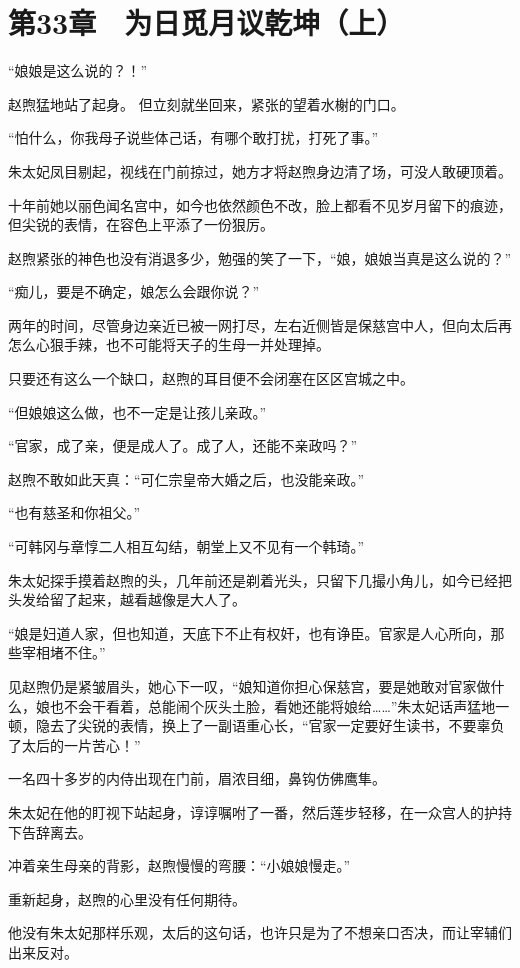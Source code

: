 \section{第33章　为日觅月议乾坤（上）}

“娘娘是这么说的？！”

赵煦猛地站了起身。 但立刻就坐回来，紧张的望着水榭的门口。

“怕什么，你我母子说些体己话，有哪个敢打扰，打死了事。”

朱太妃凤目剔起，视线在门前掠过，她方才将赵煦身边清了场，可没人敢硬顶着。

十年前她以丽色闻名宫中，如今也依然颜色不改，脸上都看不见岁月留下的痕迹，但尖锐的表情，在容色上平添了一份狠厉。

赵煦紧张的神色也没有消退多少，勉强的笑了一下，“娘，娘娘当真是这么说的？”

“痴儿，要是不确定，娘怎么会跟你说？”

两年的时间，尽管身边亲近已被一网打尽，左右近侧皆是保慈宫中人，但向太后再怎么心狠手辣，也不可能将天子的生母一并处理掉。

只要还有这么一个缺口，赵煦的耳目便不会闭塞在区区宫城之中。

“但娘娘这么做，也不一定是让孩儿亲政。”

“官家，成了亲，便是成人了。成了人，还能不亲政吗？”

赵煦不敢如此天真：“可仁宗皇帝大婚之后，也没能亲政。”

“也有慈圣和你祖父。”

“可韩冈与章惇二人相互勾结，朝堂上又不见有一个韩琦。”

朱太妃探手摸着赵煦的头，几年前还是剃着光头，只留下几撮小角儿，如今已经把头发给留了起来，越看越像是大人了。

“娘是妇道人家，但也知道，天底下不止有权奸，也有诤臣。官家是人心所向，那些宰相堵不住。”

见赵煦仍是紧皱眉头，她心下一叹，“娘知道你担心保慈宫，要是她敢对官家做什么，娘也不会干看着，总能闹个灰头土脸，看她还能将娘给……”朱太妃话声猛地一顿，隐去了尖锐的表情，换上了一副语重心长，“官家一定要好生读书，不要辜负了太后的一片苦心！”

一名四十多岁的内侍出现在门前，眉浓目细，鼻钩仿佛鹰隼。

朱太妃在他的盯视下站起身，谆谆嘱咐了一番，然后莲步轻移，在一众宫人的护持下告辞离去。

冲着亲生母亲的背影，赵煦慢慢的弯腰：“小娘娘慢走。”

重新起身，赵煦的心里没有任何期待。

他没有朱太妃那样乐观，太后的这句话，也许只是为了不想亲口否决，而让宰辅们出来反对。

